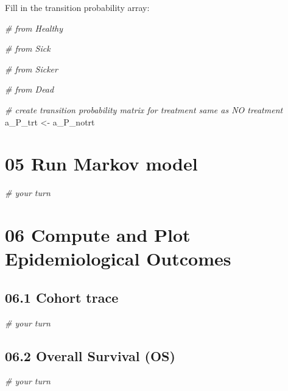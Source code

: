 \documentclass[]{article}
\newenvironment{Shaded}{\begin{snugshade}}{\end{snugshade}}
\newcommand{\StringTok}[1]{\textcolor[rgb]{0.31,0.60,0.02}{#1}}
\newcommand{\CommentTok}[1]{\textcolor[rgb]{0.56,0.35,0.01}{\textit{#1}}}
\newcommand{\NormalTok}[1]{#1}
\begin{document}
Fill in the transition probability array:

\begin{Shaded}
\begin{Highlighting}[]
\CommentTok{# from Healthy}

\CommentTok{# from Sick}

\CommentTok{# from Sicker}

\CommentTok{# from Dead}

\CommentTok{# create transition probability matrix for treatment same as NO treatment}
\NormalTok{a_P_trt <-}\StringTok{ }\NormalTok{a_P_notrt}
\end{Highlighting}
\end{Shaded}

\section{05 Run Markov model}\label{run-markov-model}

\begin{Shaded}
\begin{Highlighting}[]
\CommentTok{# your turn}
\end{Highlighting}
\end{Shaded}

\section{06 Compute and Plot Epidemiological
Outcomes}\label{compute-and-plot-epidemiological-outcomes}

\subsection{06.1 Cohort trace}\label{cohort-trace-1}

\begin{Shaded}
\begin{Highlighting}[]
\CommentTok{# your turn}
\end{Highlighting}
\end{Shaded}

\subsection{06.2 Overall Survival (OS)}\label{overall-survival-os}

\begin{Shaded}
\begin{Highlighting}[]
\CommentTok{# your turn}
\end{Highlighting}
\end{Shaded}
\end{document}
